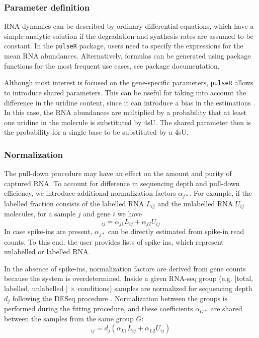 \subsubsection*{Parameter definition}
RNA dynamics can be described by ordinary differential equations,
which have a simple analytic solution 
if the degradation and synthesis rates are assumed to be constant.
In the \verb|pulseR| package,
users need to specify the expressions for the mean RNA abundances.
Alternatively, formulas can be generated using package functions for the 
most frequent use cases, see package documentation. 

Although most interest is focused on the gene-specific parameters,
\verb|pulseR| allows to introduce shared parameters.
 This can be useful for taking into account the difference in the uridine content, since
it can introduce a bias in the estimations \citep{miller2011dynamic,
schwalb2012measurement}.
In this case, the RNA abundances are multiplied by 
a probability that at least one uridine in the molecule is substituted by 4sU.
The shared parameter then is the probability for a single base to be substituted
by a 4sU.
\subsubsection*{Normalization}
The pull-down procedure may have an effect on the amount and purity of captured RNA.
To account for difference in sequencing depth and pull-down efficiency,
we introduce additional normalization factors $\alpha_{j*}$. 
 For example, 
if the labelled fraction consists of the labelled RNA $L_{ij}$ and the unlabelled RNA
 $U_{ij}$ molecules, for a sample $j$ and gene $i$ we have 
\begin{equation}
 [\text{labelled fraction}]_{ij}  = \alpha_{j1} L_{ij} + \alpha_{j2} U_{ij}
\end{equation}
In case spike-ins are present, $\alpha_{j*}$  can be directly estimated from spike-in read counts. 
To this end, the user provides lists of spike-ins, which represent unlabelled or labelled RNA.
\par
In the absence of spike-ins, 
normalization factors are derived from gene counts
because the system is overdetermined.
Inside a given RNA-seq group (e.g. [total, labelled, unlabelled ] $\times$ conditions) samples
are normalized for sequencing depth $d_j$ following the DESeq procedure \citep{anders2010differential}.
Normalization between the groups is performed during the fitting procedure, 
and these coefficients $\alpha_{G*}$  are shared between the samples from the same group $G$:
\begin{equation}
 [\text{labelled fraction}]_{ij}  = d_j(\alpha_{L1} L_{ij} + \alpha_{L2} U_{ij})
\end{equation}

